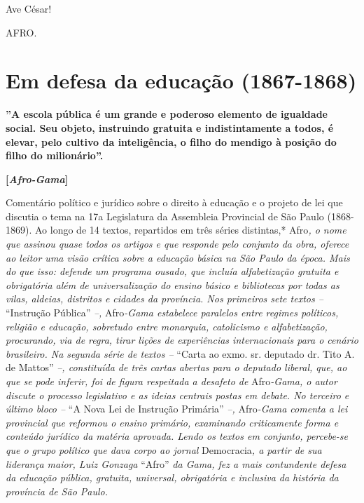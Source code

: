 Ave César!

AFRO.

\part{Em defesa da educação (1867-1868)}

\textbf{''A escola pública é um grande e poderoso elemento de igualdade
social. Seu objeto, instruindo gratuita e indistintamente a todos, é
elevar, pelo cultivo da inteligência, o filho do mendigo à posição do
filho do milionário''.}

\textbf{{[}\emph{Afro-Gama}{]}}

\begin{didascalia}
Comentário político e jurídico sobre o direito à educação e o projeto de
lei que discutia o tema na 17a Legislatura da Assembleia Provincial de
São Paulo (1868-1869). Ao longo de 14 textos, repartidos em três séries
distintas,* Afro\emph{, o nome que assinou quase todos os artigos e que
responde pelo conjunto da obra, oferece ao leitor uma visão crítica
sobre a educação básica na São Paulo da época. Mais do que isso: defende
um programa ousado, que incluía alfabetização gratuita e obrigatória
além de universalização do ensino básico e bibliotecas por todas as
vilas, aldeias, distritos e cidades da província. Nos primeiros sete
textos --} ``Instrução Pública'' \emph{--,} Afro\emph{-Gama estabelece
paralelos entre regimes políticos, religião e educação, sobretudo entre
monarquia, catolicismo e alfabetização, procurando, via de regra, tirar
lições de experiências internacionais para o cenário brasileiro. Na
segunda série de textos --} ``Carta ao exmo. sr. deputado dr. Tito A. de
Mattos'' \emph{--, constituída de três cartas abertas para o deputado
liberal, que, ao que se pode inferir, foi de figura respeitada a
desafeto de} Afro\emph{-Gama, o autor discute o processo legislativo e
as ideias centrais postas em debate. No terceiro e último bloco --} ``A
Nova Lei de Instrução Primária'' \emph{--,} Afro\emph{-Gama comenta a lei
provincial que reformou o ensino primário, examinando criticamente forma
e conteúdo jurídico da matéria aprovada. Lendo os textos em conjunto,
percebe-se que o grupo político que dava corpo ao jornal}
Democracia\emph{, a partir de sua liderança maior, Luiz Gonzaga} ``Afro''
\emph{da Gama, fez a mais contundente defesa da educação pública,
gratuita, universal, obrigatória e inclusiva da história da província de
São Paulo.}
\end{didascalia}

